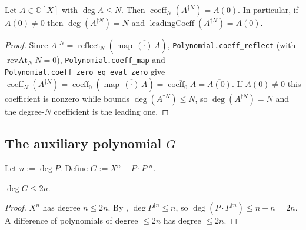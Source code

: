 \begin{lemma}
    \label{lem:conjrecip-leadingcoeff}
    \leanok
    Let $A \in \mathbb{C}[X]$ with $\deg A \le N$. Then
    $\operatorname{coeff}_N(A^{\dagger N}) = \overline{A(0)}$. In particular, if
    $A(0) \neq 0$ then $\deg(A^{\dagger N}) = N$ and
    $\operatorname{leadingCoeff}(A^{\dagger N}) = \overline{A(0)}$.
\end{lemma}
\begin{proof}
    Since $A^{\dagger N}
    = \operatorname{reflect}_N(\operatorname{map}\,\overline{(\cdot)}\,A)$,
    \texttt{Polynomial.coeff\_reflect} (with $\operatorname{revAt}_N N = 0$),
    \texttt{Polynomial.coeff\_map} and \texttt{Polynomial.coeff\_zero\_eq\_eval\_zero}
    give $\operatorname{coeff}_N(A^{\dagger N})
    = \operatorname{coeff}_0(\operatorname{map}\,\overline{(\cdot)}\,A)
    = \overline{\operatorname{coeff}_0 A} = \overline{A(0)}$. If $A(0) \neq 0$
    this coefficient is nonzero while  bounds
    $\deg(A^{\dagger N}) \le N$, so $\deg(A^{\dagger N}) = N$ and the degree-$N$
    coefficient is the leading one.
\end{proof}

\subsection{The auxiliary polynomial $G$}

\begin{definition}
    \label{def:G}
    \leanok
    Let $n := \deg P$. Define $G := X^{n} - P\cdot P^{\dagger n}$.
\end{definition}

\begin{lemma}[Degree of $G$]
    \label{lem:G-natDegree}
    \leanok
    $\deg G \le 2n$.
\end{lemma}
\begin{proof}
    $X^{n}$ has degree $n \le 2n$. By ,
    $\deg P^{\dagger n} \le n$, so $\deg(P\cdot P^{\dagger n}) \le n + n = 2n$.
    A difference of polynomials of degree $\le 2n$ has degree $\le 2n$.
\end{proof}

